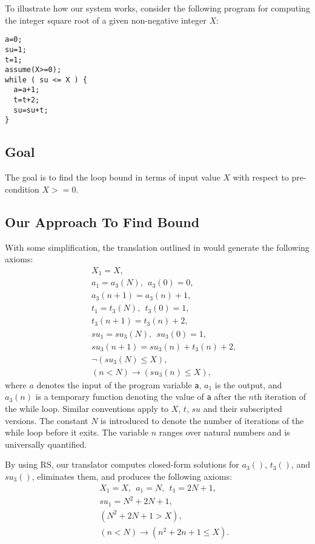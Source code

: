 \documentclass[12pt]{extarticle}
\theoremstyle{definition}
\begin{document}
To illustrate how our system works, consider the following program for computing the integer square root of a given non-negative integer $X$:
\begin{verbatim}
a=0;  
su=1; 
t=1;
assume(X>=0);
while ( su <= X ) {
  a=a+1;  
  t=t+2;  
  su=su+t; 
}
\end{verbatim}

\subsection{Goal}

The goal is to find the loop bound in terms of input value $X$ with respect to pre-condition $X>=0$.



\subsection{Our Approach To Find Bound}

With some simplification, the translation outlined in \cite{Lin20161} would generate the following axioms:
\begin{eqnarray*}
	&& X_1 = X,\\
	&& a_1 = a_3(N),\ \  a_3(0) = 0,\\  
	&& a_3(n+1) = a_3(n)+1,\\
	&& t_1 = t_3(N),\ \  t_3(0) = 1,\\  
	&& t_3(n+1) = t_3(n)+2,\\
	&& su_1 = su_3(N),\ \  su_3(0) = 1,\\
	&& su_3(n+1) = su_3(n)+t_3(n)+2,\\
	&& \neg (su_3(N)\leq X),\\
	&& (n<N) \rightarrow (su_3(n)\leq X),
\end{eqnarray*}
where $a$ denotes the input of the program variable \verb-a-, $a_1$ is the output, and $a_3(n)$ is a temporary function denoting the value of \verb-a- after the $n$th iteration of the while loop. Similar conventions apply to
$X$, $t$, $su$ and their
subscripted versions. The constant $N$ is introduced to denote the number of
iterations of the while loop before it exits. The variable $n$ ranges over
natural numbers and is universally quantified.

By using RS, our translator computes closed-form solutions
for $a_3()$, $t_3()$, and $su_3()$, eliminates them, 
and produces the following axioms:
\begin{eqnarray*}
	&& X_1 = X,\ \ 
	a_1 = N,\ \ 
	t_1 = 2N+1,\\ 
	&& su_1 = N^2+2N+1,\\
	&& (N^2+2N+1> X),\\
	&& (n<N) \rightarrow (n^2+2n+1\leq X).
\end{eqnarray*}
\end{document}
